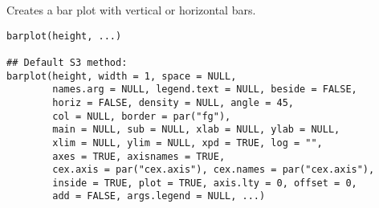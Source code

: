 %
\begin{Description}\relax
Creates a bar plot with vertical or horizontal bars.
\end{Description}
%
\begin{Usage}
\begin{verbatim}
barplot(height, ...)

## Default S3 method:
barplot(height, width = 1, space = NULL,
        names.arg = NULL, legend.text = NULL, beside = FALSE,
        horiz = FALSE, density = NULL, angle = 45,
        col = NULL, border = par("fg"),
        main = NULL, sub = NULL, xlab = NULL, ylab = NULL,
        xlim = NULL, ylim = NULL, xpd = TRUE, log = "",
        axes = TRUE, axisnames = TRUE,
        cex.axis = par("cex.axis"), cex.names = par("cex.axis"),
        inside = TRUE, plot = TRUE, axis.lty = 0, offset = 0,
        add = FALSE, args.legend = NULL, ...)
\end{verbatim}
\end{Usage}
%

